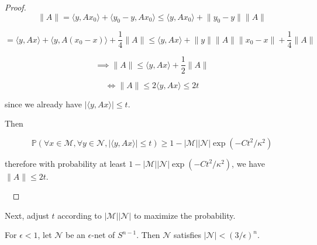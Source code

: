 \begin{proof}
\[
\lVert A \rVert = \langle y, A x_0 \rangle + \langle y_0 - y, Ax_0 \rangle \leq \langle y, Ax_0 \rangle  + \lVert y_0 - y \rVert \lVert A \rVert
\]

\[
= \langle y, Ax \rangle + \langle y, A (x_0 - x) \rangle + \frac{1}{4} \lVert A \rVert  \leq \langle y, Ax \rangle +  \lVert y \rVert \lVert A \rVert \lVert x_0 - x \rVert + \frac{1}{4} \lVert A \rVert  
\]

\[
\implies \lVert A \rVert \leq \langle y, Ax \rangle + \frac{1}{2} \lVert A \rVert  
\]

\[
\iff \lVert A \rVert \leq 2 \langle y, Ax \rangle \leq 2t
\]

since we already have \(| \langle y, Ax \rangle | \leq t\).

Then

\[
\mathbb{P} \left( \forall x \in \mathcal{M}, \forall y \in \mathcal{N}, | \langle y, Ax \rangle | \leq t \right) \geq 1 - |\mathcal{M}| | \mathcal{N}| \exp(-Ct^2/\kappa^2) 
\]

therefore with probability at least \(1 - |\mathcal{M}| | \mathcal{N}| \exp(-Ct^2/\kappa^2) \), we have \(\lVert A \rVert \leq 2 t\).

\





\end{proof}

Next, adjust \(t\) according to \(|\mathcal{M}| | \mathcal{N} |\) to maximize the probability. 

\begin{proposition}

For \(\epsilon < 1\), let \(\mathcal{N}\) be an \(\epsilon\)-net of \(S^{n-1}\). Then \(\mathcal{N}\) satisfies \(|\mathcal{N}| < (3/\epsilon)^n\).

\end{proposition}

